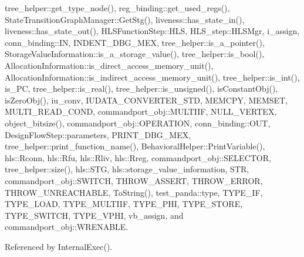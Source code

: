 tree\+\_\+helper\+::get\+\_\+type\+\_\+node(), reg\+\_\+binding\+::get\+\_\+used\+\_\+regs(), State\+Transition\+Graph\+Manager\+::\+Get\+Stg(), liveness\+::has\+\_\+state\+\_\+in(), liveness\+::has\+\_\+state\+\_\+out(), H\+L\+S\+Function\+Step\+::\+H\+LS, H\+L\+S\+\_\+step\+::\+H\+L\+S\+Mgr, i\+\_\+assign, conn\+\_\+binding\+::\+IN, I\+N\+D\+E\+N\+T\+\_\+\+D\+B\+G\+\_\+\+M\+EX, tree\+\_\+helper\+::is\+\_\+a\+\_\+pointer(), Storage\+Value\+Information\+::is\+\_\+a\+\_\+storage\+\_\+value(), tree\+\_\+helper\+::is\+\_\+bool(), Allocation\+Information\+::is\+\_\+direct\+\_\+access\+\_\+memory\+\_\+unit(), Allocation\+Information\+::is\+\_\+indirect\+\_\+access\+\_\+memory\+\_\+unit(), tree\+\_\+helper\+::is\+\_\+int(), is\+\_\+\+PC, tree\+\_\+helper\+::is\+\_\+real(), tree\+\_\+helper\+::is\+\_\+unsigned(), is\+Constant\+Obj(), is\+Zero\+Obj(), iu\+\_\+conv, I\+U\+D\+A\+T\+A\+\_\+\+C\+O\+N\+V\+E\+R\+T\+E\+R\+\_\+\+S\+TD, M\+E\+M\+C\+PY, M\+E\+M\+S\+ET, M\+U\+L\+T\+I\+\_\+\+R\+E\+A\+D\+\_\+\+C\+O\+ND, commandport\+\_\+obj\+::\+M\+U\+L\+T\+I\+IF, N\+U\+L\+L\+\_\+\+V\+E\+R\+T\+EX, object\+\_\+bitsize(), commandport\+\_\+obj\+::\+O\+P\+E\+R\+A\+T\+I\+ON, conn\+\_\+binding\+::\+O\+UT, Design\+Flow\+Step\+::parameters, P\+R\+I\+N\+T\+\_\+\+D\+B\+G\+\_\+\+M\+EX, tree\+\_\+helper\+::print\+\_\+function\+\_\+name(), Behavioral\+Helper\+::\+Print\+Variable(), hls\+::\+Rconn, hls\+::\+Rfu, hls\+::\+Rliv, hls\+::\+Rreg, commandport\+\_\+obj\+::\+S\+E\+L\+E\+C\+T\+OR, tree\+\_\+helper\+::size(), hls\+::\+S\+TG, hls\+::storage\+\_\+value\+\_\+information, S\+TR, commandport\+\_\+obj\+::\+S\+W\+I\+T\+CH, T\+H\+R\+O\+W\+\_\+\+A\+S\+S\+E\+RT, T\+H\+R\+O\+W\+\_\+\+E\+R\+R\+OR, T\+H\+R\+O\+W\+\_\+\+U\+N\+R\+E\+A\+C\+H\+A\+B\+LE, To\+String(), test\+\_\+panda\+::type, T\+Y\+P\+E\+\_\+\+IF, T\+Y\+P\+E\+\_\+\+L\+O\+AD, T\+Y\+P\+E\+\_\+\+M\+U\+L\+T\+I\+IF, T\+Y\+P\+E\+\_\+\+P\+HI, T\+Y\+P\+E\+\_\+\+S\+T\+O\+RE, T\+Y\+P\+E\+\_\+\+S\+W\+I\+T\+CH, T\+Y\+P\+E\+\_\+\+V\+P\+HI, vb\+\_\+assign, and commandport\+\_\+obj\+::\+W\+R\+E\+N\+A\+B\+LE.



Referenced by Internal\+Exec().

